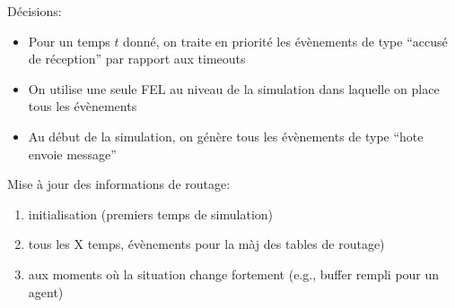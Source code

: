 \documentclass[a4paper,11pt]{report}
\begin{document}

\tableofcontents %
\pagebreak
\listoffigures %
\pagebreak
\listoftables %
\pagebreak

Décisions:
\begin{itemize}
 \item Pour un temps $t$ donné, on traite en priorité les évènements de type ``accusé de réception'' par rapport aux timeouts 
 \item On utilise une seule FEL au niveau de la simulation dans laquelle on place tous les évènements
 \item Au début de la simulation, on génère tous les évènements de type ``hote envoie message''
\end{itemize}


Mise à jour des informations de routage:
\begin{enumerate}
 \item initialisation (premiers temps de simulation)
 \item tous les X temps, évènements pour la màj des tables de routage)
 \item aux moments où la situation change fortement (e.g., buffer rempli pour un agent)
\end{enumerate}

\clearpage
\end{document}
